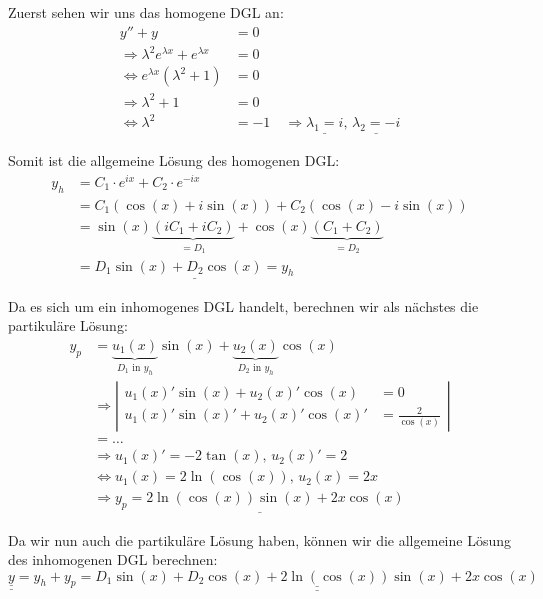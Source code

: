 Zuerst sehen wir uns das homogene DGL an:
\begin{align*}
y'' + y &= 0\\
\Rightarrow \lambda^2 e^{\lambda x} + e^{\lambda x} &= 0\\
\Leftrightarrow e^{\lambda x} (\lambda^2 + 1) &=0 \\
\Rightarrow \lambda^2 + 1 &= 0\\
\Leftrightarrow \lambda^2 &= -1 \quad
\Rightarrow \underline{\lambda_1 = i},\, \underline{\lambda_2 = -i}
\end{align*}

Somit ist die allgemeine Lösung des homogenen DGL:
\begin{align*}
y_h &= C_1 \cdot e^{ix} + C_2 \cdot e^{-ix}\\
&= C_1 (\cos(x) + i\sin(x)) + C_2(\cos(x) - i\sin(x))\\
&= \sin(x) \underbrace{(i C_1 + i C_2)}_{ = D_1} + \cos(x) \underbrace{(C_1 + C_2)}_{= D_2}\\
&= \underline{D_1 \sin(x) + D_2 \cos(x) = y_h}
\end{align*}

Da es sich um ein inhomogenes DGL handelt, berechnen wir als nächstes die partikuläre
Lösung:
\begin{align*}
y_p &= \underbrace{u_1(x)}_{D_1 \text{ in } y_h} \sin(x) + \underbrace{u_2(x)}_{D_2 \text{ in } y_h} \cos(x)\\
&\Rightarrow \left|
	\begin{aligned}
		u_1(x)' \sin(x) + u_2(x)' \cos(x) &= 0\\
		u_1(x)' \sin(x)' + u_2(x)' \cos(x)' &= \frac{2}{\cos(x)}
	\end{aligned}
\right|\\
&= \ldots\\
&\Rightarrow u_1(x)' = -2 \tan(x),\, u_2(x)' = 2\\
&\Leftrightarrow u_1(x) = 2 \ln(\cos(x)),\, u_2(x) = 2x\\
&\Rightarrow \underline{y_p = 2 \ln(\cos(x)) \sin(x) + 2x \cos(x)}
\end{align*}

Da wir nun auch die partikuläre Lösung haben, können wir die allgemeine Lösung
des inhomogenen DGL berechnen:
$\underline{\underline{y}} = y_h + y_p = \underline{\underline{D_1 \sin(x) + D_2 \cos(x) + 2 \ln(\cos(x)) \sin(x) + 2x \cos(x)}}$
